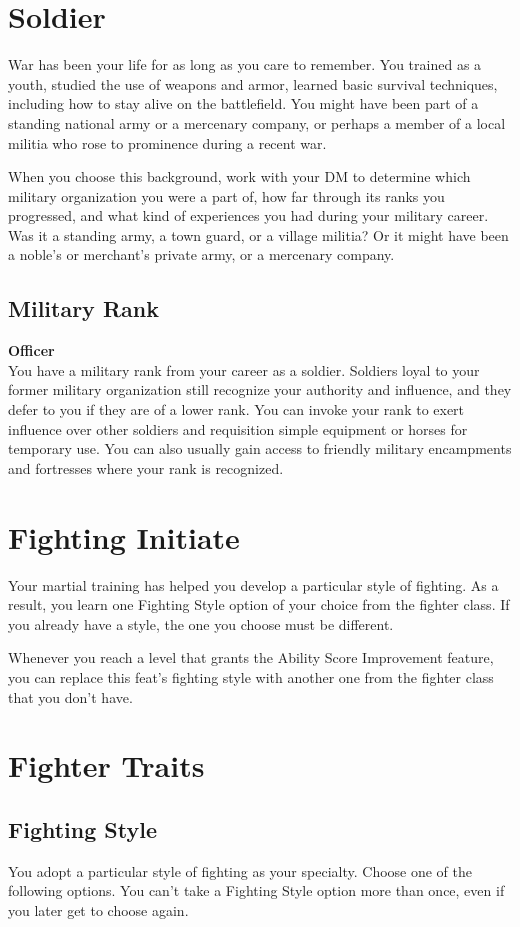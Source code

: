 {\section*{Soldier}
War has been your life for as long as you care to remember. You trained as a youth, studied the use of weapons and armor, learned basic survival techniques, including how to stay alive on the battlefield. You might have been part of a standing national army or a mercenary company, or perhaps a member of a local militia who rose to prominence during a recent war.

When you choose this background, work with your DM to determine which military organization you were a part of, how far through its ranks you progressed, and what kind of experiences you had during your military career. Was it a standing army, a town guard, or a village militia? Or it might have been a noble's or merchant's private army, or a mercenary company.
\subsection*{Military Rank}
\textbf{Officer}\\
You have a military rank from your career as a soldier. Soldiers loyal to your former military organization still recognize your authority and influence, and they defer to you if they are of a lower rank. You can invoke your rank to exert influence over other soldiers and requisition simple equipment or horses for temporary use. You can also usually gain access to friendly military encampments and fortresses where your rank is recognized.

\section*{Fighting Initiate}
Your martial training has helped you develop a particular style of fighting. As a result, you learn one Fighting Style option of your choice from the fighter class. If you already have a style, the one you choose must be different.

Whenever you reach a level that grants the Ability Score Improvement feature, you can replace this feat's fighting style with another one from the fighter class that you don't have.

\section*{Fighter Traits}
\subsection*{Fighting Style}
You adopt a particular style of fighting as your specialty. Choose one of the following options. You can't take a Fighting Style option more than once, even if you later get to choose again.
}
